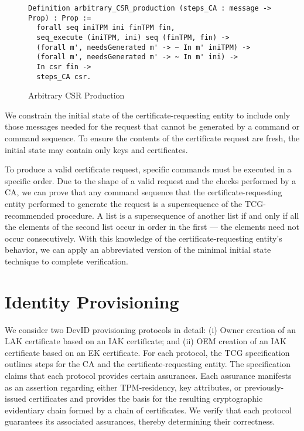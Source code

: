 \documentclass[runningheads]{llncs}
\begin{document}

\begin{figure}[hbtp]
  \begin{lstlisting}[language=Coq]
Definition arbitrary_CSR_production (steps_CA : message -> Prop) : Prop :=
  forall seq iniTPM ini finTPM fin,
  seq_execute (iniTPM, ini) seq (finTPM, fin) ->
  (forall m', needsGenerated m' -> ~ In m' iniTPM) ->
  (forall m', needsGenerated m' -> ~ In m' ini) ->
  In csr fin ->
  steps_CA csr.
  \end{lstlisting}
  \caption{Arbitrary CSR Production}
  \label{fig:csr-production}
\end{figure}

We constrain the initial state of the certificate-requesting entity to
include only those messages needed for the request that cannot be
generated by a command or command sequence.  To ensure the contents of
the certificate request are fresh, the initial state may contain only
keys and certificates.

To produce a valid certificate request, specific commands
must be executed in a specific order.  Due to the shape of a valid
request and the checks performed by a CA, we can prove that any
command sequence that the certificate-requesting entity performed to
generate the request is a supersequence of the TCG-recommended procedure. 
A list is a supersequence of another list if and only if all the elements 
of the second list occur in order in the first --- the elements need not
occur consecutively.  With this knowledge of the
certificate-requesting entity's behavior, we can apply an abbreviated
version of the minimal initial state technique to complete
verification.

\section{Identity Provisioning}

We consider two DevID provisioning protocols in detail: (i) Owner
creation of an LAK certificate based on an IAK certificate; and (ii)
OEM creation of an IAK certificate based on an EK certificate. For
each protocol, the TCG specification outlines steps for the CA and the
certificate-requesting entity. The specification claims that each
protocol provides certain assurances. Each assurance manifests as
an assertion regarding either TPM-residency, key attributes, or
previously-issued certificates and provides the basis for the
resulting cryptographic evidentiary chain formed by a chain of
certificates. We verify that each protocol guarantees its associated
assurances, thereby determining their correctness.
\end{document}
